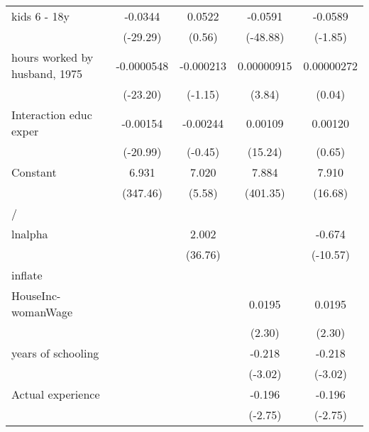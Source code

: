 {\begin{longtable}{l*{4}{c}}
kids 6 - 18y        &     -0.0344\sym{***}&      0.0522         &     -0.0591\sym{***}&     -0.0589         \\
                    &    (-29.29)         &      (0.56)         &    (-48.88)         &     (-1.85)         \\
hours worked by husband, 1975&  -0.0000548\sym{***}&   -0.000213         &  0.00000915\sym{***}&  0.00000272         \\
                    &    (-23.20)         &     (-1.15)         &      (3.84)         &      (0.04)         \\
Interaction educ exper&    -0.00154\sym{***}&    -0.00244         &     0.00109\sym{***}&     0.00120         \\
                    &    (-20.99)         &     (-0.45)         &     (15.24)         &      (0.65)         \\
Constant            &       6.931\sym{***}&       7.020\sym{***}&       7.884\sym{***}&       7.910\sym{***}\\
                    &    (347.46)         &      (5.58)         &    (401.35)         &     (16.68)         \\
\hline
/                   &                     &                     &                     &                     \\
lnalpha             &                     &       2.002\sym{***}&                     &      -0.674\sym{***}\\
                    &                     &     (36.76)         &                     &    (-10.57)         \\
\hline
inflate             &                     &                     &                     &                     \\
HouseInc-womanWage  &                     &                     &      0.0195\sym{*}  &      0.0195\sym{*}  \\
                    &                     &                     &      (2.30)         &      (2.30)         \\
years of schooling  &                     &                     &      -0.218\sym{**} &      -0.218\sym{**} \\
                    &                     &                     &     (-3.02)         &     (-3.02)         \\
Actual experience   &                     &                     &      -0.196\sym{**} &      -0.196\sym{**} \\
                    &                     &                     &     (-2.75)         &     (-2.75)         \\

\end{longtable}}
